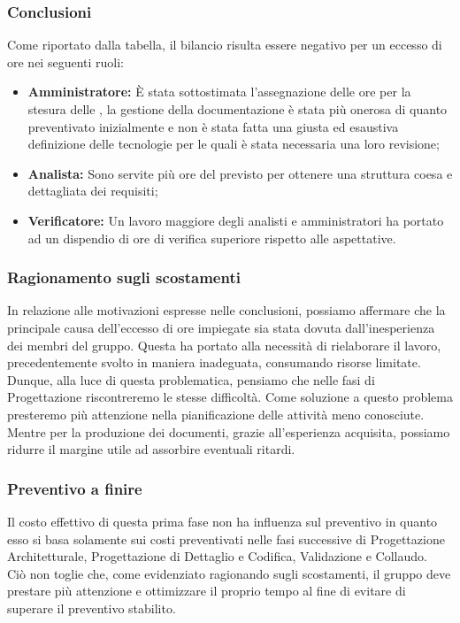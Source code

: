 \subsubsection{Conclusioni}
Come riportato dalla tabella, il bilancio risulta essere negativo per un eccesso di ore nei seguenti ruoli:
\begin{itemize}
	\item \textbf{Amministratore:} È stata sottostimata l'assegnazione delle ore per la stesura delle \NdP{}, la gestione della documentazione è stata più onerosa di quanto preventivato inizialmente e non è stata fatta una giusta ed esaustiva definizione delle tecnologie per le quali è stata necessaria una loro revisione;
	\item \textbf{Analista:} Sono servite più ore del previsto per ottenere una struttura coesa e dettagliata dei requisiti;
	\item \textbf{Verificatore:} Un lavoro maggiore degli analisti e amministratori ha portato ad un dispendio di ore di verifica superiore rispetto alle aspettative.
\end{itemize}

\subsubsection{Ragionamento sugli scostamenti}
In relazione alle motivazioni espresse nelle conclusioni, possiamo affermare che la principale causa dell'eccesso di ore impiegate sia stata dovuta dall'inesperienza dei membri del gruppo. Questa ha portato alla necessità di rielaborare il lavoro, precedentemente svolto in maniera inadeguata, consumando risorse limitate.
Dunque, alla luce di questa problematica, pensiamo che nelle fasi di Progettazione riscontreremo le stesse difficoltà. Come soluzione a questo problema presteremo più attenzione nella pianificazione delle attività meno conosciute. Mentre per la produzione dei documenti, grazie all'esperienza acquisita, possiamo ridurre il margine utile ad assorbire eventuali ritardi.

\subsubsection{Preventivo a finire}
Il costo effettivo di questa prima fase non ha influenza sul preventivo in quanto esso si basa solamente sui costi preventivati nelle fasi successive di Progettazione Architetturale, Progettazione di Dettaglio e Codifica, Validazione e Collaudo.\\
Ciò non toglie che, come evidenziato ragionando sugli scostamenti, il gruppo deve prestare più attenzione e ottimizzare il proprio tempo al fine di evitare di superare il preventivo stabilito. 